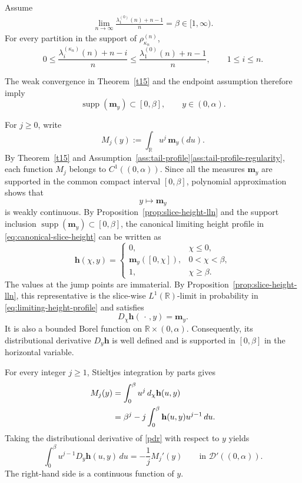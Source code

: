 \documentclass[11pt]{amsart}
\theoremstyle{plain}
\numberwithin{equation}{section}
\numberwithin{theorem}{section}
\numberwithin{figure}{section}
\begin{document}
 
\begingroup
Assume
\begin{eqnarray*}
\lim_{n\rightarrow\infty}
\frac{\lambda_1^{(0)}(n)+n-1}{n}
=\beta\in[1,\infty).
\end{eqnarray*}
For every partition in the support of \(\rho_{\kappa_n}^{(n)}\),
\[
    0\leq
    \frac{\lambda_i^{(\kappa_n)}(n)+n-i}{n}
    \leq
    \frac{\lambda_1^{(0)}(n)+n-1}{n},
    \qquad 1\leq i\leq n.
\]

The weak convergence in Theorem~\ref{t15} and the endpoint assumption
therefore imply
\endgroup
\[
    \operatorname{supp}(\mathbf m_y)\subset[0,\beta],
    \qquad y\in(0,\alpha).
\]


For $j\geq0$, write
\[
    M_j(y)
    :=
    \int_{\mathbb R}u^j\,\mathbf m_y(du).
\]
By Theorem~\ref{t15} and
Assumption~\ref{ass:tail-profile}\ref{ass:tail-profile-regularity},
each function $M_j$ belongs to $C^1((0,\alpha))$. Since all the
measures $\mathbf m_y$ are supported in the common compact interval
$[0,\beta]$, polynomial approximation shows that
\[
    y\longmapsto\mathbf m_y
\]
is weakly continuous. By
Proposition~\ref{prop:slice-height-lln} and the support inclusion
\(\operatorname{supp}(\mathbf m_y)\subset[0,\beta]\), the canonical
limiting height profile in \eqref{eq:canonical-slice-height} can be
written as
\begin{equation}
    \mathbf h(\chi,y)=
    \begin{cases}
        0, & \chi\leq0,\\
        \mathbf m_y([0,\chi]), & 0<\chi<\beta,\\
        1, & \chi\geq\beta.
    \end{cases}
    \label{eq:canonical-height-profile}
\end{equation}
The values at the jump points are immaterial. By
Proposition~\ref{prop:slice-height-lln}, this representative is the
slice-wise \(L^1(\mathbb R)\)-limit in probability in
\eqref{eq:limiting-height-profile} and satisfies
\[
    D_\chi\mathbf h(\,\cdot\,,y)=\mathbf m_y.
\]
It is also a bounded Borel function on
\(\mathbb R\times(0,\alpha)\). Consequently, its distributional derivative
\(D_y\mathbf h\) is well defined and is supported in \([0,\beta]\) in the
horizontal variable.

For every integer $j\geq1$, Stieltjes integration by parts gives
\begin{align}
M_j(y)
&=
\int_0^\beta u^j\,d_\chi\mathbf h(u,y)\notag\\
&=
\beta^j-j\int_0^\beta
\mathbf h(u,y)u^{j-1}\,du.
\label{pdr}
\end{align}
Taking the distributional derivative of \eqref{pdr} with respect to
$y$ yields
\begin{equation}
    \int_0^\beta
    u^{j-1}D_y\mathbf h(u,y)\,du
    =
    -\frac1j M_j'(y)
    \qquad\text{in }\mathcal D'((0,\alpha)).
    \label{eq:weak-vertical-moments}
\end{equation}
The right-hand side is a continuous function of $y$.
\end{document}
